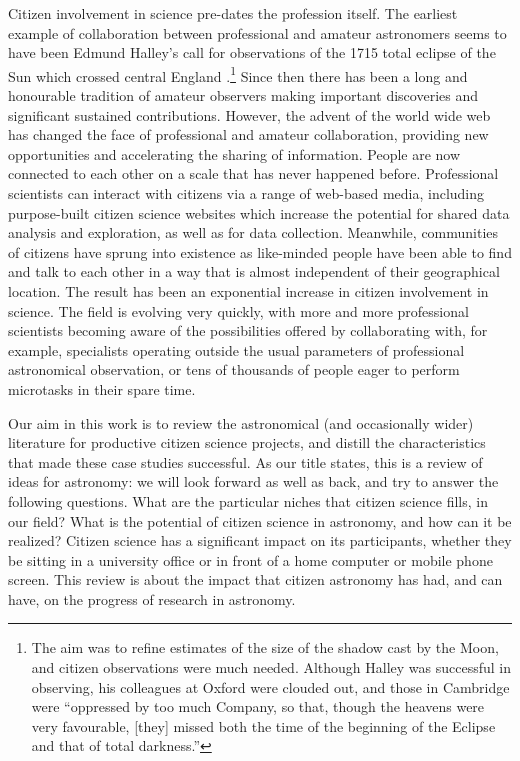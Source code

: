 \documentclass{ar2e}
\begin{document}
Citizen involvement in science pre-dates the profession itself. The earliest
example of collaboration between professional and amateur astronomers seems to
have been Edmund Halley's call for observations of the 1715 total eclipse of the
Sun which crossed central England \citep{Halley}.\footnote{The aim was to refine
estimates of the size of the shadow cast by the Moon, and citizen observations
were much needed. Although Halley was successful in observing, his colleagues at
Oxford were clouded out, and those in Cambridge were ``oppressed by too much
Company, so that, though the heavens were very favourable, [they] missed both
the time of the beginning of the Eclipse and that of total darkness.''}  Since
then there has been a long and honourable tradition of amateur observers
making important discoveries and significant sustained contributions. However,
the advent of the world wide web has changed the face of professional and
amateur collaboration, providing new opportunities and accelerating the sharing
of information. People are now connected to each other on a scale that has never
happened before. Professional scientists can interact with citizens via a range
of web-based media, including purpose-built citizen science websites which
increase the potential for shared data analysis and exploration, as well as for
data collection. Meanwhile, communities of citizens have sprung into existence
as like-minded people have been able to find and talk to each other in a way
that is almost independent of their geographical location. The result has been
an exponential increase in citizen involvement in science. The field is evolving
very quickly, with more and more professional scientists becoming aware of the
possibilities offered by collaborating with, for example, specialists operating
outside the usual parameters of professional astronomical observation, or tens
of thousands of people eager to perform microtasks in their spare time.  

Our aim in this work is to review the astronomical (and occasionally wider)
literature for productive citizen science projects, and distill the
characteristics that made these case studies successful.  As our title states,
this is a review of ideas for astronomy: we will look forward as well as back,
and try to answer the following questions. What are the particular niches that
citizen science fills, in our field? What is the potential of citizen science in
astronomy, and how can it be realized?  Citizen science has a significant impact
on its participants,  whether they be sitting in a university office or in front
of a home computer or mobile phone screen. This review is about the impact that
citizen astronomy has had, and can have, on the progress of  research in
astronomy.
\end{document}
